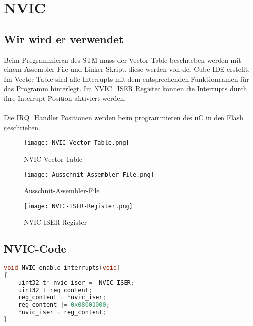 \newpage
\section{NVIC}
    \subsection{Wir wird er verwendet}
        Beim Programmieren des STM muss der Vector Table beschrieben werden mit einem Assembler File und Linker Skript, diese werden von der Cube IDE erstellt.\\
        Im Vector Table sind alle Interrupts mit dem entsprechenden Funktionnamen für das Programm hinterlegt.
        Im NVIC\_ISER Register können die Interrupts durch ihre Interrupt Position aktiviert werden.\\\\
        Die IRQ\_Handler Positionen werden beim programmieren des uC in den Flash geschrieben. 

        \begin{figure}[!htb]
            \centering
            \texttt{[image: NVIC-Vector-Table.png]}
            \caption{NVIC-Vector-Table}
            \label{caption:ANVIC-Vector-Table}
        \end{figure}

\newpage
        \begin{figure}[!htb]
            \centering
            \texttt{[image: Ausschnit-Assembler-File.png]}
            \caption{Ausschnit-Assembler-File}
            \label{caption:Ausschnit-Assembler-File}
        \end{figure}
\newpage
        \begin{figure}[!htb]
            \centering
            \texttt{[image: NVIC-ISER-Register.png]}
            \caption{NVIC-ISER-Register}
            \label{caption:NVIC-ISER-Register}
        \end{figure}
        
    \subsection{NVIC-Code}
        \begin{lstlisting}[language=C, style=CStyle, caption=NVIC-enable-interrupts, captionpos=b, label=NVIC-enable-interrupts]
void NVIC_enable_interrupts(void)
{
    uint32_t* nvic_iser =  NVIC_ISER;
    uint32_t reg_content;
    reg_content = *nvic_iser;
    reg_content |= 0x08001000;
    *nvic_iser = reg_content;
}
        \end{lstlisting}
